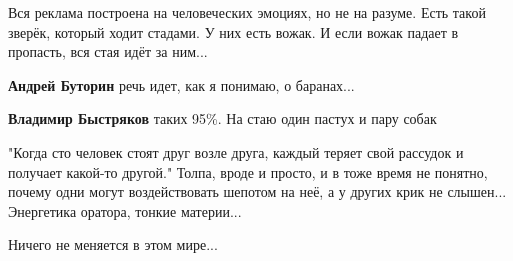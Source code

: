 \begin{itemize}
 

Вся реклама построена на человеческих эмоциях, но не на разуме. Есть такой
зверёк, который ходит стадами. У них есть вожак. И если вожак падает в
пропасть, вся стая идёт за ним...

\begin{itemize}
 
\textbf{Андрей Буторин} речь идет, как я понимаю, о баранах...

 
\textbf{Владимир Быстряков} таких 95\%. На стаю один пастух и пару собак
\end{itemize}

 

"Когда сто человек стоят друг возле друга, каждый теряет свой рассудок и
получает какой-то другой." Толпа, вроде и просто, и в тоже время не понятно,
почему одни могут воздействовать шепотом на неё, а у других крик не слышен...
Энергетика оратора, тонкие материи...


 
Ничего не меняется в этом мире...

\begin{itemize}
 

\end{itemize}
\end{itemize}
